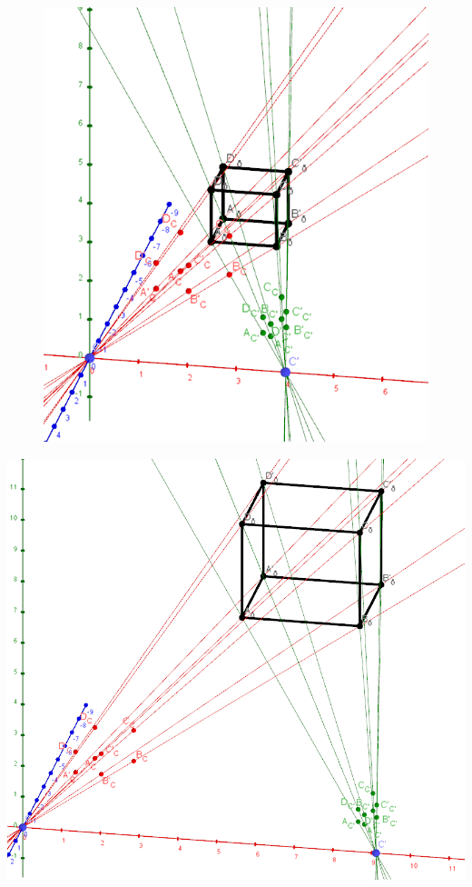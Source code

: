 \begin{figure}[!htb]
	\includegraphics[width=\linewidth]{images/ScaleInvariance_2.png}
	\caption{}
	\label{fig:scale2}
	\endminipage\hfill
\end{figure}
\pagebreak


\begin{minipage}{\linewidth}
	\centering
	\includegraphics[width=0.42\linewidth]{images/ScaleInvariance_3.png}
	\label{fig:scale3}
\end{minipage}

